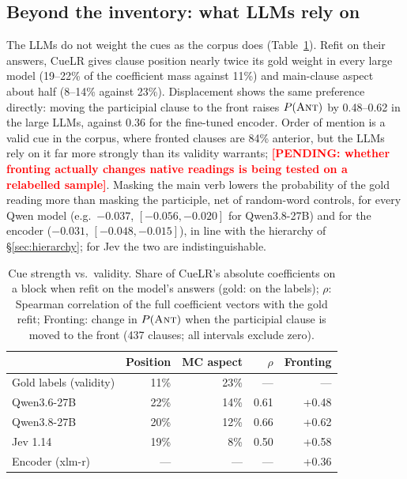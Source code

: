 \documentclass[11pt]{article}
\newcommand{\pending}[1]{\textcolor{red}{\textbf{[PENDING: #1]}}}
\begin{document}
\subsection{Beyond the inventory: what LLMs rely on}
\label{sec:beyond}
The LLMs do not weight the cues as the corpus does (Table~\ref{tab:strength}). Refit on their answers, CueLR gives clause position nearly twice its gold weight in every large model (19--22\% of the coefficient mass against 11\%) and main-clause aspect about half (8--14\% against 23\%). Displacement shows the same preference directly: moving the participial clause to the front raises $P(\textsc{Ant})$ by 0.48--0.62 in the large LLMs, against 0.36 for the fine-tuned encoder. Order of mention is a valid cue in the corpus, where fronted clauses are 84\% anterior, but the LLMs rely on it far more strongly than its validity warrants; \pending{whether fronting actually changes native readings is being tested on a relabelled sample}. Masking the main verb lowers the probability of the gold reading more than masking the participle, net of random-word controls, for every Qwen model (e.g.\ $-0.037$, $[-0.056, -0.020]$ for Qwen3.8-27B) and for the encoder ($-0.031$, $[-0.048, -0.015]$), in line with the hierarchy of \S\ref{sec:hierarchy}; for Jev the two are indistinguishable.

\begin{table}[t]
\centering\small
\setlength{\tabcolsep}{4pt}
\begin{tabular}{lrrrr}
\toprule
 & Position & MC aspect & $\rho$ & Fronting \\
\midrule
Gold labels (validity) & 11\% & 23\% & --- & --- \\
Qwen3.6-27B & 22\% & 14\% & 0.61 & +0.48 \\
Qwen3.8-27B & 20\% & 12\% & 0.66 & +0.62 \\
Jev 1.14 & 19\% & 8\% & 0.50 & +0.58 \\
Encoder (xlm-r) & --- & --- & --- & +0.36 \\
\bottomrule
\end{tabular}
\caption{Cue strength vs.\ validity. Share of CueLR's absolute coefficients on a block when refit on the model's answers (gold: on the labels); $\rho$: Spearman correlation of the full coefficient vectors with the gold refit; Fronting: change in $P(\textsc{Ant})$ when the participial clause is moved to the front (437 clauses; all intervals exclude zero).}
\label{tab:strength}
\end{table}
\end{document}
